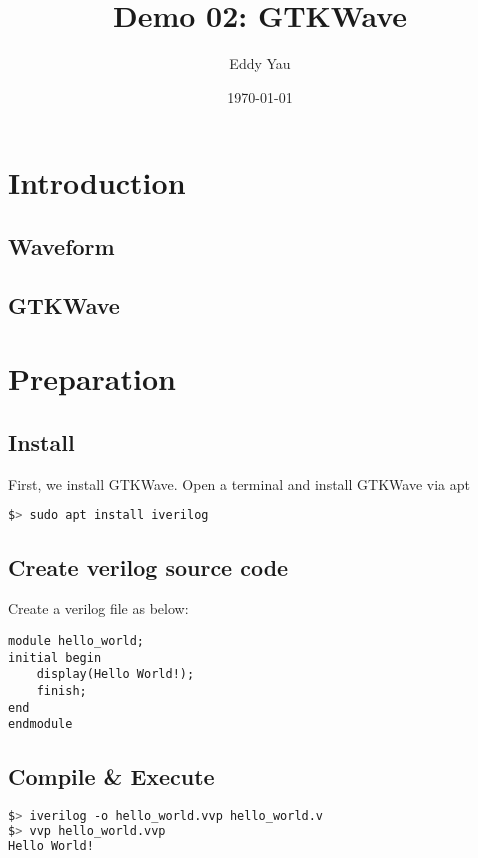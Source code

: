 \documentclass[12pt,a4paper]{article}
\title{Demo 02: GTKWave\vspace{-1ex}}
\author{Eddy Yau\vspace{-2ex}}
\date{\today}
\begin{document}
\maketitle 
\section{Introduction}
\subsection{Waveform}
\subsection{GTKWave}
\section{Preparation}
\subsection{Install}
First, we install GTKWave. Open a terminal and install GTKWave via apt
\begin{lstlisting}[language=bash,basicstyle=\small\ttfamily,framexleftmargin=30pt,frame=single,numbers=none]
$> sudo apt install iverilog
\end{lstlisting}
\subsection{Create verilog source code}
Create a verilog file as below:
\begin{lstlisting}[style={verilog-style},frame=single,firstnumber=1,caption=hello\_world.v]
module hello_world;
initial begin
    display(Hello World!);
    finish;
end
endmodule
\end{lstlisting}
\subsection{Compile \& Execute}
\begin{lstlisting}[language=bash,basicstyle=\small\ttfamily,framexleftmargin=30pt,frame=single,numbers=none]
$> iverilog -o hello_world.vvp hello_world.v
$> vvp hello_world.vvp
Hello World!
\end{lstlisting}
\printbibliography
\end{document}

